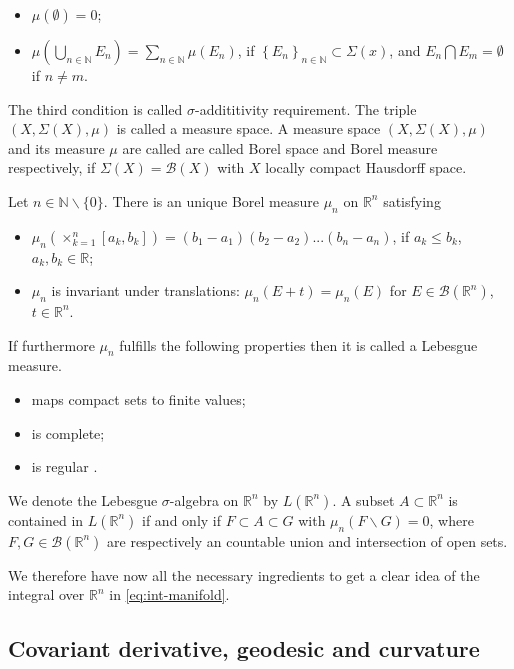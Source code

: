 \documentclass[10pt]{book}
\newcommand{\Bcal}{\mathcal{B}}
\newcommand{\Nbb}{\mathbb{N}}
\newcommand{\Rbb}{\mathbb{R}}
\theoremstyle{break}
\begin{document}
%
\begin{itemize}
\item $\mu(\emptyset) = 0$;
\item $\mu\left( \underset{n \in \mathbb{N}}{\bigcup} E_n \right) = \underset{n \in \mathbb{N}}{\sum} \mu(E_n)$, if $\left\{E_n\right\}_{n\in\mathbb{N}} \subset \Sigma(x)$, and $E_n \bigcap E_m = \emptyset$ if $n\neq m$.
\end{itemize}
%
The third condition is called $\sigma$-addititivity requirement. The triple $(X,\Sigma(X),\mu)$ is called a measure space. 
%
A measure space $(X, \Sigma(X), \mu)$ and its measure $\mu$ are called are called Borel space and Borel measure respectively, if $\Sigma(X) = \mathcal{B}(X)$ with $X$ locally compact Hausdorff space.


\bigskip


Let $n \in \Nbb \backslash \{0\}$. There is an unique Borel measure $\mu_n$ on $\mathbb{R}^n$ satisfying
%
\begin{itemize}
\item  $\mu_n ( \times_{k=1}^{n} [a_k,b_k] ) = (b_1 - a_1)(b_2 - a_2) ... (b_n - a_n) $, if $a_k \leq b_k$, $a_k, b_k \in \mathbb{R}$;
\item $\mu_n$ is invariant under translations: $\mu_n (E + t) = \mu_n (E)$ for $E \in \mathcal{B}(\mathbb{R}^n)$, $t \in \mathbb{R}^n$.
\end{itemize}
%
If furthermore $\mu_n$ fulfills the following properties then it is called a Lebesgue measure.
%
\begin{itemize}
\item maps compact sets to finite values;
\item is complete; 
\item is regular .
\end{itemize}
%
We denote the Lebesgue $\sigma$-algebra on $\mathbb{R}^{n}$ by $L(\Rbb^n)$. A subset $A \subset \Rbb^n$ is contained in $L(\Rbb^n)$ if and only if $F \subset A \subset G$ with $\mu_n(F\backslash G) =0$, where $F, G \in \Bcal(\Rbb^n)$ are respectively an countable union and intersection of open sets.


\bigskip


We therefore have now all the necessary ingredients to get a clear idea of the integral over $\Rbb^n$ in \ref{eq:int-manifold}.


\subsection{Covariant derivative, geodesic and curvature}
\end{document}
